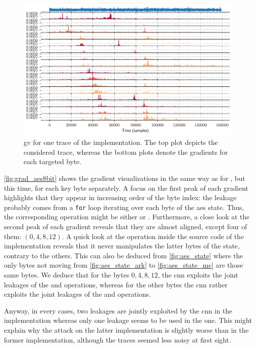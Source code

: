 \paragraph{\aeshuitbit{}}
\begin{figure}
	\centering
	\includegraphics[width=\textwidth]{../Chapter6/Figures/grad_viz/v2/grads}
	\caption{\gls{gv} for one trace of the \aeshuitbit{} implementation.
	The top plot depicts the considered trace, whereas the bottom plots denote
	the gradients for each targeted byte.}
	\label{fig:grad_aes8bit}
\end{figure}
\autoref{fig:grad_aes8bit} shows the gradient visualizations in the same way as for \mbedTLS{}, but this time, for each key byte separately.
A focus on the first peak of each gradient highlights that they appear in increasing order of the byte index: the leakage probably comes from a \verb+for+ loop iterating over each byte of the \gls{aes} state.
Thus, the corresponding operation might be either \ark{} or \sub{}.
Furthermore, a close look at the second peak of each gradient reveals that they are almost aligned, except four of them: \((0, 4, 8, 12)\).
A quick look at the \sr{} operation inside the source code of the \aeshuitbit{} implementation reveals that it never manipulates the latter bytes of the state, contrary to the others.
This can also be deduced from \autoref{fig:aes_state} where the only bytes not moving from \autoref{fig:aes_state_ark} to \autoref{fig:aes_state_mc} are those same bytes.
We deduce that for the bytes \(0, 4, 8, 12\), the \gls{cnn} exploits the joint leakages of the \ark{} and \sub{} operations, whereas for the other bytes the \gls{cnn} rather exploits the joint leakages of the \ark{} and \sr{} operations.

Anyway, in every cases, two leakages are jointly exploited by the \gls{cnn} in the \aeshuitbit{} implementation whereas only one leakage seems to be used in the \mbedTLS{} one.
This might explain why the attack on the latter implementation is slightly worse than in the former implementation, although the traces seemed less noisy at first sight. 


